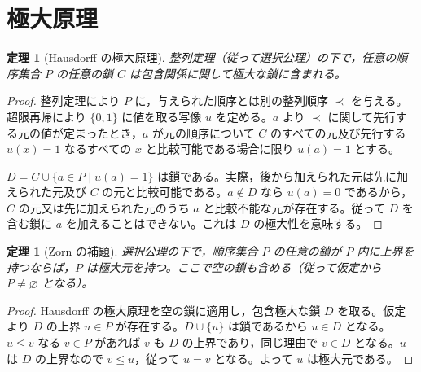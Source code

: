 \documentclass[a5paper,10pt,dvipdfmx]{jsarticle}
\theoremstyle{definition}
\theoremstyle{plain}
\newtheorem{thm}[ruledef]{定理}
\begin{document}
\section{極大原理}
\begin{thm}[Hausdorff の極大原理]\label{k130}
整列定理（従って選択公理）の下で，任意の順序集合 $P$ の任意の鎖 $C$ は包含関係に関して極大な鎖に含まれる。
\end{thm}
\begin{proof}
整列定理により $P$ に，与えられた順序とは別の整列順序 $\prec$ を与える。超限再帰により $\{0,1\}$ に値を取る写像 $u$ を定める。$a$ より $\prec$ に関して先行する元の値が定まったとき，$a$ が元の順序について $C$ のすべての元及び先行する $u(x)=1$ なるすべての $x$ と比較可能である場合に限り $u(a)=1$ とする。

$D=C\cup\{a\in P\mid u(a)=1\}$ は鎖である。実際，後から加えられた元は先に加えられた元及び $C$ の元と比較可能である。$a\notin D$ なら $u(a)=0$ であるから，$C$ の元又は先に加えられた元のうち $a$ と比較不能な元が存在する。従って $D$ を含む鎖に $a$ を加えることはできない。これは $D$ の極大性を意味する。
\end{proof}
\begin{thm}[Zorn の補題]\label{k131}
選択公理の下で，順序集合 $P$ の任意の鎖が $P$ 内に上界を持つならば，$P$ は極大元を持つ。ここで空の鎖も含める（従って仮定から $P\ne\varnothing$ となる）。
\end{thm}
\begin{proof}
Hausdorff の極大原理を空の鎖に適用し，包含極大な鎖 $D$ を取る。仮定より $D$ の上界 $u\in P$ が存在する。$D\cup\{u\}$ は鎖であるから $u\in D$ となる。$u\leq v$ なる $v\in P$ があれば $v$ も $D$ の上界であり，同じ理由で $v\in D$ となる。$u$ は $D$ の上界なので $v\leq u$，従って $u=v$ となる。よって $u$ は極大元である。
\end{proof}
\end{document}
